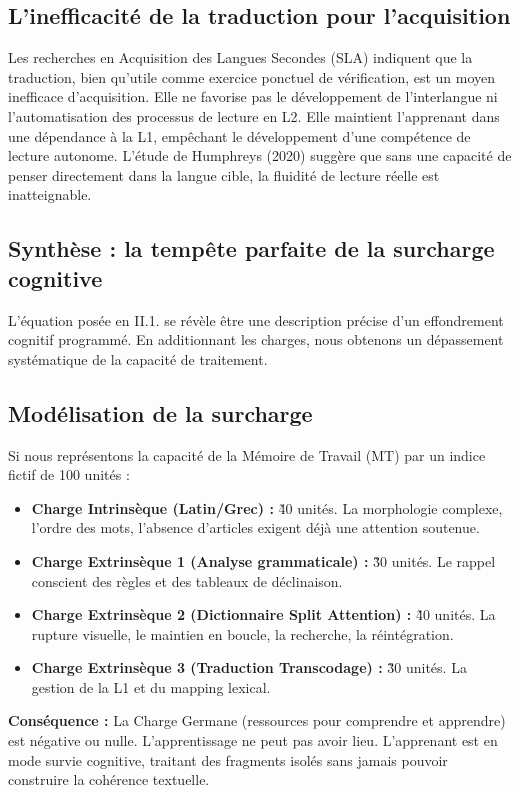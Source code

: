 \subsection{L'inefficacité de la traduction pour l'acquisition}

Les recherches en Acquisition des Langues Secondes (SLA) indiquent que la traduction, bien qu'utile
comme exercice ponctuel de vérification, est un moyen inefficace d'acquisition. Elle ne favorise pas
le développement de l'interlangue ni l'automatisation des processus de lecture en L2. Elle maintient
l'apprenant dans une dépendance à la L1, empêchant le développement d'une compétence de lecture
autonome.\cite{II-1-3-ref36} L'étude de Humphreys (2020) suggère que sans une capacité de penser
directement dans la langue cible, la fluidité de lecture réelle est
inatteignable.\cite{II-1-3-ref38}



\subsection{Synthèse : la tempête parfaite de la surcharge cognitive}

L'équation posée en II.1.\cite{II-1-3-ref3} se révèle être une description précise d'un effondrement
cognitif programmé. En additionnant les charges, nous obtenons un dépassement systématique de la
capacité de traitement.



\subsection{Modélisation de la surcharge}

Si nous représentons la capacité de la Mémoire de Travail (MT) par un indice fictif de 100 unités :

\begin{itemize}\item \textbf{Charge Intrinsèque (Latin/Grec) :} \~40 unités. La morphologie complexe, l'ordre des mots, l'absence d'articles exigent déjà une attention soutenue.\item \textbf{Charge Extrinsèque 1 (Analyse grammaticale) :} \~30 unités. Le rappel conscient des règles et des tableaux de déclinaison.\item \textbf{Charge Extrinsèque 2 (Dictionnaire \- Split Attention) :} \~40 unités. La rupture visuelle, le maintien en boucle, la recherche, la réintégration.\item \textbf{Charge Extrinsèque 3 (Traduction \- Transcodage) :} \~30 unités. La gestion de la L1 et du mapping lexical.\end{itemize}\textbf{Conséquence :} La Charge Germane (ressources pour comprendre et apprendre) est négative ou
nulle. L'apprentissage ne peut pas avoir lieu. L'apprenant est en mode \og survie cognitive\fg{},
traitant des fragments isolés sans jamais pouvoir construire la cohérence
textuelle.\cite{II-1-3-ref3}



